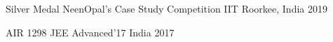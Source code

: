 \begin{cvhonors}

  \cvhonor
    {Silver Medal} %
    {NeenOpal's Case Study Competition} %
    {IIT Roorkee, India} %
    {2019} %

  \cvhonor
    {AIR 1298} %
    {JEE Advanced'17} %
    {India} %
    {2017} %

\end{cvhonors}
